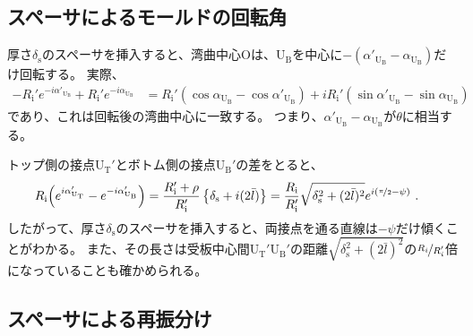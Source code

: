 \subsection{スペーサによるモールドの回転角}
厚さ$\delta_\mathrm s$のスペーサを挿入すると、湾曲中心Oは、U$_\mathrm B$を中心に$-\left(\alpha'_{\mathrm U_\mathrm B}\!-\alpha_{\mathrm U_\mathrm B}\right)$だけ回転する。
実際、
\begin{align*}
  -R_\mathrm i'e^{-i\alpha'_{\mathrm U_\mathrm B}}+R_\mathrm i'e^{-i\alpha_{\mathrm U_\mathrm B}}
  &= R_\mathrm i'(\cos\alpha_{\mathrm U_\mathrm B}-\cos\alpha'_{\mathrm U_\mathrm B})
     +iR_\mathrm i'(\sin\alpha'_{\mathrm U_\mathrm B}-\sin\alpha_{\mathrm U_\mathrm B})
\end{align*}
であり、これは回転後の湾曲中心に一致する。
つまり、$\alpha'_{\mathrm U_\mathrm B}\!-\alpha_{\mathrm U_\mathrm B}$が$\theta$に相当する。
\begin{hosoku}
トップ側の接点U$_\mathrm T'$とボトム側の接点U$_\mathrm B'$の差をとると、
\begin{align*}
  R_\mathrm i\!\left(e^{i\alpha_{\mathrm U_\mathrm T}'}-e^{-i\alpha'_{\mathrm U_\mathrm B}}\right)
  &= \frac{R_\mathrm i'+\rho}{R_\mathrm i'}\left\{\delta_\mathrm s+i(2\bar l)\right\}
   = \frac{R_\mathrm i}{R_\mathrm i'}\sqrt{\delta_\mathrm s^2+(2\bar l)^2}e^{i(\nicefrac\pi2-\psi)}\ .
\end{align*}
したがって、厚さ$\delta_\mathrm s$のスペーサを挿入すると、両接点を通る直線は$-\psi$だけ傾くことがわかる。
また、その長さは受板中心間U$_\mathrm T'$U$_\mathrm B'$の距離$\sqrt{\delta_\mathrm s^2+(2\bar l)^2}$の$\nicefrac{R_i}{R_i'}$倍になっていることも確かめられる。
\end{hosoku}


\subsection{スペーサによる再振分け}



